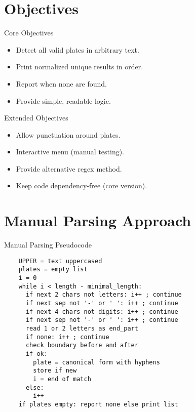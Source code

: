 \documentclass[aspectratio=169]{beamer}
\begin{document}
\section{Objectives}

\begin{frame}{Core Objectives}
  \begin{itemize}
    \item Detect all valid plates in arbitrary text.
    \item Print normalized unique results in order.
    \item Report when none are found.
    \item Provide simple, readable logic.
  \end{itemize}
\end{frame}

\begin{frame}{Extended Objectives}
  \begin{itemize}
    \item Allow punctuation around plates.
    \item Interactive menu (manual testing).
    \item Provide alternative regex method.
    \item Keep code dependency-free (core version).
  \end{itemize}
\end{frame}

\section{Manual Parsing Approach}

\begin{frame}[fragile]{Manual Parsing Pseudocode}
\footnotesize
  \begin{verbatim}
    UPPER = text uppercased
    plates = empty list
    i = 0
    while i < length - minimal_length:
      if next 2 chars not letters: i++ ; continue
      if next sep not '-' or ' ': i++ ; continue
      if next 4 chars not digits: i++ ; continue
      if next sep not '-' or ' ': i++ ; continue
      read 1 or 2 letters as end_part
      if none: i++ ; continue
      check boundary before and after
      if ok:
        plate = canonical form with hyphens
        store if new
        i = end of match
      else:
        i++
    if plates empty: report none else print list
  \end{verbatim}
\end{frame}
\end{document}
